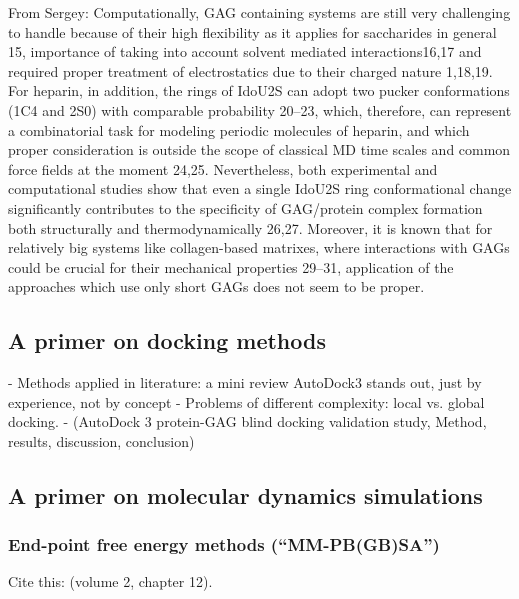 From Sergey: Computationally, GAG containing systems are still very challenging
to handle because of their high flexibility as it applies for saccharides in
general 15, importance of taking into account solvent mediated interactions16,17
and required proper treatment of electrostatics due to their charged nature
1,18,19. For heparin, in addition, the rings of IdoU2S can adopt two pucker
conformations (1C4 and 2S0) with comparable probability 20–23, which, therefore,
can represent a combinatorial task for modeling periodic molecules of heparin,
and which proper consideration is outside the scope of classical MD time scales
and common force fields at the moment 24,25. Nevertheless, both experimental and
computational studies show that even a single IdoU2S ring conformational change
significantly contributes to the specificity of GAG/protein complex formation
both structurally and thermodynamically 26,27. Moreover, it is known
that for relatively big systems like collagen-based matrixes, where interactions
with GAGs could be crucial for their mechanical properties 29–31, application of
the approaches which use only short GAGs does not seem to be proper.



\subsection{A primer on docking methods}


    - Methods applied in literature: a mini review
        AutoDock3 stands out, just by experience, not by concept
    - Problems of different complexity: local vs. global docking.
    - (AutoDock 3 protein-GAG blind docking validation study,
        Method, results, discussion, conclusion)

\lipsum[1-5]

\subsection{A primer on molecular dynamics simulations}

\lipsum[1-5]

\subsubsection{End-point free energy methods (\enquote{MM-PB(GB)SA})}
\label{methods:mmpbsa_mmgbsa}


Cite this: \cite{schlick_innovationsdynamics_2012} (volume 2, chapter 12).

